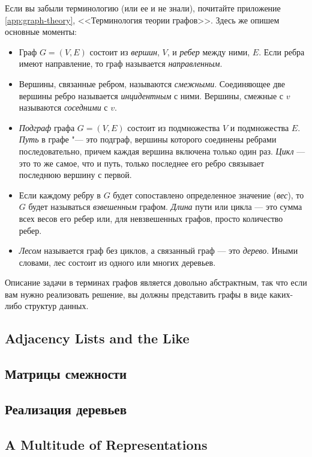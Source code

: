 Если вы забыли терминологию (или ее и не знали), почитайте приложение \ref{app:graph-theory}, <<Терминология теории графов>>. Здесь же опишем основные моменты:
\begin{itemize}
\item Граф $G = (V, E)$ состоит из \textit{вершин}, $V$, и \textit{ребер} между ними, $E$. Если ребра имеют направление, то граф называется \textit{направленным}.
\item Вершины, связанные ребром, называются \textit{смежными}. Соединяющее две вершины ребро называется \textit{инцидентным} с ними. Вершины, смежные с $v$ называются \textit{соседними} с $v$.
\item \textit{Подграф} графа $G = (V,E)$ состоит из подмножества $V$ и подмножества $E$. \textit{Путь} в графе "--- это подграф, вершины которого соединены ребрами последовательно, причем каждая вершина включена только один раз. \textit{Цикл} — это то же самое, что и путь, только последнее его ребро связывает последнюю вершину с первой.
\item Если каждому ребру в $G$ будет сопоставлено определенное значение (\textit{вес}), то $G$ будет называться \textit{взвешенным} графом. \textit{Длина} пути или цикла — это сумма всех весов его ребер или, для невзвешенных графов, просто количество ребер.
\item \textit{Лесом} называется граф без циклов, а связанный граф — это \textit{дерево}. Иными словами, лес состоит из одного или многих деревьев.
\end{itemize}

Описание задачи в терминах графов является довольно абстрактным, так что если вам нужно реализовать решение, вы должны представить графы в виде каких-либо структур данных.


\subsection{Adjacency Lists and the Like}
\subsection{Матрицы смежности}
\subsection{Реализация деревьев}
\subsection{A Multitude of Representations}

